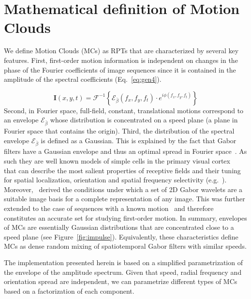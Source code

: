 \documentclass[a4paper,11pt]{article}%
\begin{document}
\section{Mathematical definition of Motion Clouds}\label{section:MathClouds}


We define Motion Clouds (MCs) as RPTs that are characterized by several key features. First, first-order motion information is  independent on changes in the phase of the Fourier coefficients of image sequences since it is contained in the amplitude of the spectral coefficients (Eq.~\ref{eq:gen4}).

%
\begin{equation}
\mathbf{I}(x, y, t) = \mathcal{F}^{-1}\left\{\mathcal{E}_{\bar{\beta}}(f_x,f_y,f_t) \cdot e^{i\phi(f_x,f_y,f_t)}\right\}
\label{eq:fourier_image}
\end{equation}
Second, in Fourier space, full-field, constant, translational motions correspond to an envelope $\mathcal{E}_{\bar{\beta}}$ whose distribution is concentrated on a speed  plane (a plane in Fourier space that contains the origin). Third, the distribution of the spectral envelope  $\mathcal{E}_{\bar{\beta}}$ is defined as a Gaussian. This is explained by the fact that Gabor filters have a Gaussian envelope and thus an optimal spread in Fourier space~\citep{Marcelja80}. As such they are well known models of simple cells in the primary visual cortex~\citep{Daugman80} that can describe the most salient properties of receptive fields and their tuning for spatial localization, orientation and spatial frequency selectivity (e.g.~\citep{Jones87}). Moreover,~\citet{Lee96}  derived the conditions under which a set of 2D Gabor wavelets are a suitable image basis for a complete representation of any image. This was further extended to the case of sequences with a known motion~\citep{Watson95} and therefore constitutes an accurate set for studying first-order motion. In summary, envelopes of MCs are essentially Gaussian distributions that are concentrated close to a speed plane (see Figure~\ref{fig:impulse}). Equivalently, these characteristics define MCs as {dense random mixing of spatiotemporal Gabor filters with similar speeds}. 

The implementation presented herein is based on a simplified parametrization of the envelope of the amplitude spectrum. Given that speed, radial frequency and orientation spread are independent, we can parametrize different types of MCs based on a factorization of each component. %
	
\end{document}
